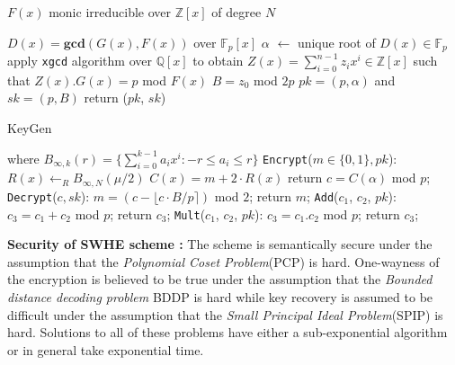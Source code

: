 \documentclass{acm_proc_article-sp}
\begin{document}
\linesnumbered
\begin{algorithm}[H]
 \SetVline
 $F(x)$ monic irreducible over $\mathbb{Z}[x]$ of degree $N$\;

$D(x)=\mathrm{\textbf{gcd}}(G(x),F(x))$ over $\mathbb{F}_p[x]$\;
$\alpha$ $\leftarrow$ unique root of $D(x) \in \mathbb{F}_p $ \;
apply \texttt{xgcd} algorithm over $\mathbb{Q}[x]$ to obtain $Z(x) = \sum_{i=0}^{n-1}{z_ix^i} \in \mathbb{Z}[x] $  such that $Z(x).G(x)=p$ mod $F(x)$\;
$B=z_0$ mod $2p$\;
$pk = (p, \alpha)$ and $sk = (p , B)$\;
return ($pk$, $sk$)\;
\caption{KeyGen\label{Code:SV}}
\end{algorithm}

where $ B_{\infty , k}(r) = \{\sum_{i=0}^{k-1}{a_i}x^i : -r \leq a_i \leq r \} $ \newline \newline
\texttt{Encrypt}($m \in \{0,1\} , pk$): 
\newline \phantom{x}\hspace{3ex}  $R(x) \leftarrow_{R}B_{\infty , N}(\mu/2)$
 \; $C(x)=m+2\cdot R(x)$ 
\newline \phantom{x}\hspace{3ex} return  $c=C(\alpha)$ mod $p$;
\newline \texttt{Decrypt}($c, sk$):
\newline \phantom{x}\hspace{3ex} $m = (c - \lfloor c \cdot B/p \rceil )$ mod $2$;
\phantom{x}\hspace{1ex} return $m$;
\newline \texttt{Add}($c_1$, $c_2$, $pk$):
\newline \phantom{x}\hspace{3ex} $c_3=c_1+c_2$ mod $p$; 
\phantom{x}\hspace{1ex}  return $c_3$;
\newline \texttt{Mult}($c_1$, $c_2$, $pk$):
 \newline \phantom{x}\hspace{3ex}  $c_3=c_1.c_2$ mod $p$; 
\phantom{x}\hspace{1ex}  return $c_3$; 

\textbf{Security of SWHE scheme :} The scheme is semantically secure under the assumption that the \textit{Polynomial Coset Problem}(PCP) is hard. One-wayness of the encryption is believed to be true under the assumption that the \textit{Bounded distance decoding problem} BDDP is hard while key recovery is assumed to be difficult under the assumption that the \textit{Small Principal Ideal Problem}(SPIP) is hard. Solutions to all of these problems have either a sub-exponential algorithm or in general take exponential time.
\end{document}
